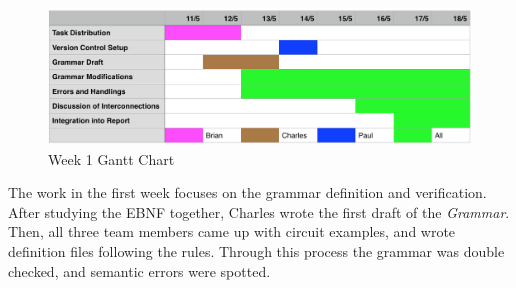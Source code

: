 \documentclass[12pt]{article}
\def\n{\noindent}
\begin{document}
\begin{figure}[H]
    \centering
    \includegraphics[scale=0.6]{week1_gantt}
    \caption{Week 1 Gantt Chart}
\end{figure}

\n The work in the first week focuses on the grammar definition and verification. After studying the EBNF together, Charles wrote the first draft of the \textit{Grammar}. Then, all three team members came up with circuit examples, and wrote definition files following the rules. Through this process the grammar was double checked, and semantic errors were spotted. \\

\end{document}
